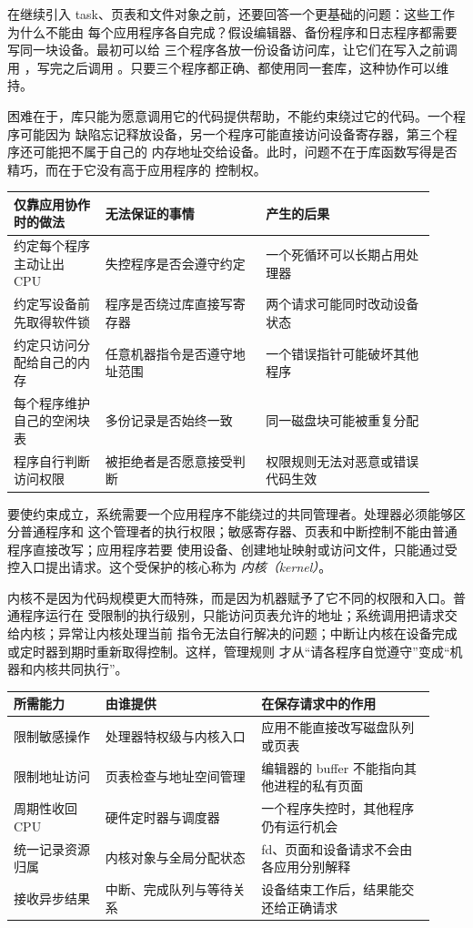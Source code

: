 在继续引入 task、页表和文件对象之前，还要回答一个更基础的问题：这些工作为什么不能由
每个应用程序各自完成？假设编辑器、备份程序和日志程序都需要写同一块设备。最初可以给
三个程序各放一份设备访问库，让它们在写入之前调用 ，写完之后调用
。只要三个程序都正确、都使用同一套库，这种协作可以维持。

困难在于，库只能为愿意调用它的代码提供帮助，不能约束绕过它的代码。一个程序可能因为
缺陷忘记释放设备，另一个程序可能直接访问设备寄存器，第三个程序还可能把不属于自己的
内存地址交给设备。此时，问题不在于库函数写得是否精巧，而在于它没有高于应用程序的
控制权。

\begin{longtable}{|L{0.2\linewidth}|L{0.35\linewidth}|L{0.37\linewidth}|}
\toprule
仅靠应用协作时的做法 & 无法保证的事情 & 产生的后果 \\
\midrule
约定每个程序主动让出 CPU & 失控程序是否会遵守约定 & 一个死循环可以长期占用处理器 \\\tablerowrule
约定写设备前先取得软件锁 & 程序是否绕过库直接写寄存器 & 两个请求可能同时改动设备状态 \\\tablerowrule
约定只访问分配给自己的内存 & 任意机器指令是否遵守地址范围 & 一个错误指针可能破坏其他程序 \\\tablerowrule
每个程序维护自己的空闲块表 & 多份记录是否始终一致 & 同一磁盘块可能被重复分配 \\\tablerowrule
程序自行判断访问权限 & 被拒绝者是否愿意接受判断 & 权限规则无法对恶意或错误代码生效 \\
\bottomrule
\end{longtable}

要使约束成立，系统需要一个应用程序不能绕过的共同管理者。处理器必须能够区分普通程序和
这个管理者的执行权限；敏感寄存器、页表和中断控制不能由普通程序直接改写；应用程序若要
使用设备、创建地址映射或访问文件，只能通过受控入口提出请求。这个受保护的核心称为
\emph{内核（kernel）}。

内核不是因为代码规模更大而特殊，而是因为机器赋予了它不同的权限和入口。普通程序运行在
受限制的执行级别，只能访问页表允许的地址；系统调用把请求交给内核；异常让内核处理当前
指令无法自行解决的问题；中断让内核在设备完成或定时器到期时重新取得控制。这样，管理规则
才从“请各程序自觉遵守”变成“机器和内核共同执行”。

\begin{longtable}{|L{0.2\linewidth}|L{0.34\linewidth}|L{0.38\linewidth}|}
\toprule
所需能力 & 由谁提供 & 在保存请求中的作用 \\
\midrule
限制敏感操作 & 处理器特权级与内核入口 & 应用不能直接改写磁盘队列或页表 \\\tablerowrule
限制地址访问 & 页表检查与地址空间管理 & 编辑器的 buffer 不能指向其他进程的私有页面 \\\tablerowrule
周期性收回 CPU & 硬件定时器与调度器 & 一个程序失控时，其他程序仍有运行机会 \\\tablerowrule
统一记录资源归属 & 内核对象与全局分配状态 & fd、页面和设备请求不会由各应用分别解释 \\\tablerowrule
接收异步结果 & 中断、完成队列与等待关系 & 设备结束工作后，结果能交还给正确请求 \\
\bottomrule
\end{longtable}

